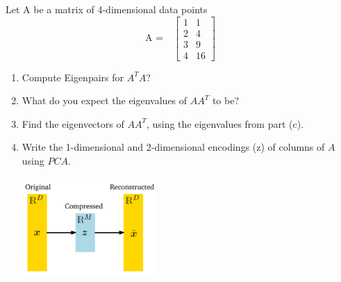 \documentclass[10pt, a4paper]{article}
\begin{document}
\newpage
\subsubsection*{}
\begin{Problem}
    Let A be a matrix of 4-dimensional data points
    \[ \text{A =} \quad \begin{bmatrix} 1 & 1 \\ 2 & 4
                \\ 3 & 9 \\ 4 & 16\end{bmatrix} \]

    \begin{enumerate}
        \item  Compute Eigenpairs for $A^{T}A$?
        \item  What do you expect the eigenvalues of $AA^{T}$ to be?
        \item  Find the eigenvectors of $AA^{T}$, using the eigenvalues from part (c).
        \item Write the 1-dimensional and 2-dimensional encodings (z) of
              columns of $A$ using $PCA$.
              \begin{center}
                  \includegraphics[width=0.4\textwidth]{images/q4.png} \\
              \end{center}
    \end{enumerate}
\end{Problem}
\end{document}
